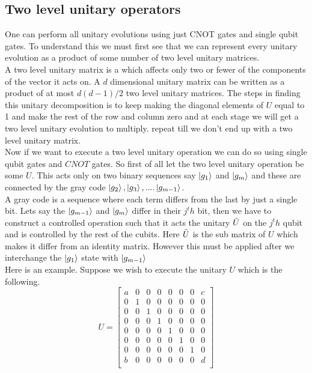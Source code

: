 \documentclass{report}
\begin{document}
\subsection{Two level unitary operators}
One can perform all unitary evolutions using just CNOT gates and single qubit gates. To understand this we must first see that we can represent every unitary evolution as a product of some number of two level unitary matrices.\\
A two level unitary matrix is a which affects only two or fewer of the components of the vector it acts on. A $d$ dimensional unitary matrix can be written as a product of at most $d(d-1)/2$ two level unitary matrices. The steps in finding this unitary decomposition is to keep making the diagonal elements of $U$ equal to 1 and make the rest of the row and column zero and at each stage we will get a two level unitary evolution to multiply. repeat till we don't end up with a two level unitary matrix.\\
Now if we want to execute a two level unitary operation we can do so using single qubit gates and $CNOT$ gates. So first of all let the two level unitary operation be some $U$. This acts only on two binary sequences say $\ket{g_1}$ and $\ket{g_m}$ and these are connected by the gray code $\ket{g_2}, \ket{g_3},....\ket{g_{m-1}}$. \\
A gray code is a sequence where each term differs from the last by just a single bit. Lets say the $\ket{g_{m-1}}$ and $\ket{g_m}$ differ in their $j^th$ bit, then we have to construct a controlled operation such that it acts the unitary $\Tilde{U}$ on the $j^th$ qubit and is controlled by the rest of the cubits. Here $\Tilde{U}$ is the sub matrix of $U$ which makes it differ from an identity matrix. However this must be applied after we interchange the $\ket{g_1}$ state with $\ket{g_{m-1}}$\\
Here is an example. Suppose we wish to execute the unitary $U$ which is the following.
$$U = \begin{bmatrix}
      a & 0 & 0 & 0 & 0 & 0 & 0 & c\\
      0 & 1 & 0 & 0 & 0 & 0 & 0 & 0\\
      0 & 0 & 1 & 0 & 0 & 0 & 0 & 0\\
      0 & 0 & 0 & 1 & 0 & 0 & 0 & 0\\
      0 & 0 & 0 & 0 & 1 & 0 & 0 & 0\\
      0 & 0 & 0 & 0 & 0 & 1 & 0 & 0\\
      0 & 0 & 0 & 0 & 0 & 0 & 1 & 0\\
      b & 0 & 0 & 0 & 0 & 0 & 0 & d\\
      \end{bmatrix}$$
\end{document}
